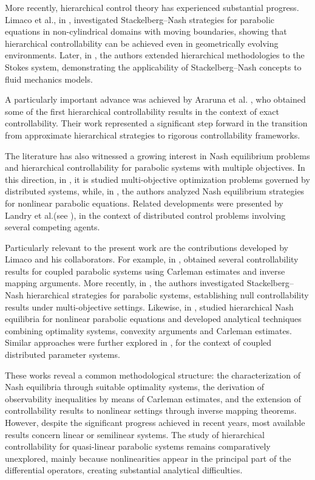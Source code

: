 \documentclass[11pt,a4paper]{amsart}
\numberwithin{equation}{section}
\begin{document}
More recently, hierarchical control theory has experienced substantial progress. Limaco et al., in \cite{Li-Clark}, investigated Stackelberg–Nash strategies for parabolic equations in non-cylindrical domains with moving boundaries, showing that hierarchical controllability can be achieved even in geometrically evolving environments. Later, in \cite{Gui-Mar-Ro}, the authors extended hierarchical methodologies to the Stokes system, demonstrating the applicability of Stackelberg–Nash concepts to fluid mechanics models.

A particularly important advance was achieved by Araruna et al. \cite{Ara-EFC-San2015, Ara-EFC-Gue}, who obtained some of the first hierarchical controllability results in the context of exact controllability. Their work represented a significant step forward in the transition from approximate hierarchical strategies to rigorous controllability frameworks.

The literature has also witnessed a growing interest in Nash equilibrium problems and hierarchical controllability for parabolic systems with multiple objectives. In this direction, in \cite{Hernandez-Teresa-16}, it is studied multi-objective optimization problems governed by distributed systems, while, in \cite{Kere-Mer-Mop},  the authors analyzed Nash equilibrium strategies for nonlinear parabolic equations. Related developments were presented by Landry et al.(see  \cite{Landry2023}), in the context of distributed control problems involving several competing agents.

Particularly relevant to the present work are the contributions developed by Limaco and his collaborators. For example, in \cite{EFC-Li2003, Cara-Limaco-21}, obtained several controllability results for coupled parabolic systems using Carleman estimates and inverse mapping arguments. More recently, in \cite{GYL-Carleman-2025}, the authors investigated Stackelberg–Nash hierarchical strategies for parabolic systems, establishing null controllability results under multi-objective settings. Likewise, in \cite{Danny2022, Danny2021}, studied hierarchical Nash equilibria for nonlinear parabolic equations and developed analytical techniques combining optimality systems, convexity arguments and Carleman estimates. Similar approaches were further explored in \cite{Nunez-Li2023}, for the context of coupled distributed parameter systems.

These works reveal a common methodological structure: the characterization of Nash equilibria through suitable optimality systems, the derivation of observability inequalities by means of Carleman estimates, and the extension of controllability results to nonlinear settings through inverse mapping theorems. However, despite the significant progress achieved in recent years, most available results concern linear or semilinear systems. The study of hierarchical controllability for quasi-linear parabolic systems remains comparatively unexplored, mainly because nonlinearities appear in the principal part of the differential operators, creating substantial analytical difficulties.
\end{document}
